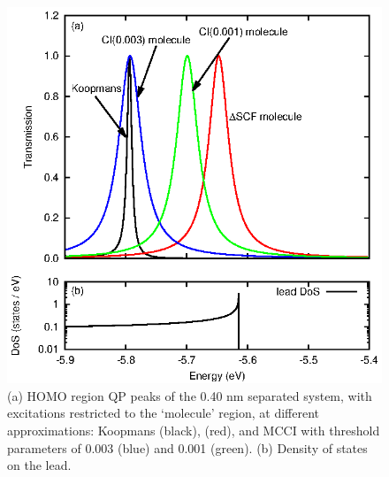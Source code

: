 \begin{figure}
	\begin{center}
		\includegraphics[width=0.9\linewidth]{figures/figure6a_6b}
	\end{center}
	\caption{(a) HOMO region \ac{QP} peaks of the 0.40 nm separated
	         system, with excitations restricted to the `molecule' region,
		 at different approximations: Koopmans (black),
		 \dscf (red), and MCCI with threshold parameters of
		 0.003 (blue) and 0.001 (green). (b) Density of states on the
		 lead.}
	\label{fig:all40Ahomo}
\end{figure}

